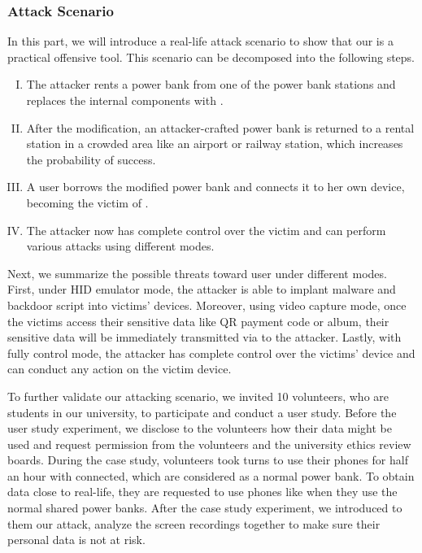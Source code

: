 \subsubsection{Attack Scenario}

In this part, we will introduce a real-life attack scenario to show that our
\tool is a practical offensive tool.  This scenario can be decomposed into the
following steps.

\begin{enumerate}[I. ]
	\item The attacker rents a power bank from one of the power bank stations and replaces the internal components with \tool.
	\item After the modification, an attacker-crafted power bank is returned to a rental station in a crowded area like an airport or railway station, which increases the probability of success.
	\item A user borrows the modified power bank and connects it to her own device, becoming the victim of \tool.
	\item The attacker now has complete control over the victim and can perform various attacks using different modes.
\end{enumerate}

Next, we summarize the possible threats toward user under different modes.
First, under HID emulator mode, the attacker is able to implant malware and backdoor script into victims' devices. Moreover, using video capture mode, once the victims access their sensitive data like QR payment  code or album, their sensitive data will be immediately transmitted via \tool to the attacker. Lastly, with fully control mode, the attacker has complete control over the victims' device and can conduct any action on the victim device.


To further validate our attacking scenario, we invited 10 volunteers, who are students in our university, to participate and conduct a user study.
Before the user study experiment, we disclose to the volunteers how their data might be used and request permission from the volunteers and the university ethics review boards.
During the case study, volunteers took turns to use their phones for half an hour with \tool connected, which are considered as a normal power bank.
To obtain data close to real-life, they are requested to use phones like when they use the normal shared power banks.
After the case study experiment, we introduced to them our attack, analyze the screen recordings together to make sure their personal data is not at risk.


